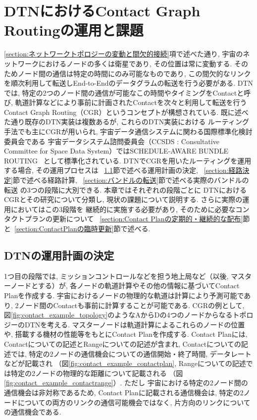 \chapter{DTNにおけるContact Graph Routingの運用と課題}
\label{chap:cgr_in_dtn}

\ref{section:ネットワークトポロジーの変動と間欠的接続}項で述べた通り, 
宇宙のネットワークにおけるノードの多くは衛星であり, その位置は常に変動する.  
そのためノード間の通信は特定の時間にのみ可能なものであり, 
この間欠的なリンクを順次利用して転送しEnd-to-Endのデータグラムの転送を行う必要がある.  
DTNでは, 特定の2つのノード間の通信が可能なこの時間やタイミングをContactと呼び, 
軌道計算などにより事前に計画されたContactを次々と利用して転送を行う
Contact Graph Routing（CGR）\cite{Fraire2021}というコンセプトが構想されている.  
既に述べた通り既存のDTN実装は複数あるが, これらのDTN実装における
ルーティング手法でも主にCGRが用いられ, 宇宙データ通信システムに関わる国際標準化検討委員会である
宇宙データシステム諮問委員会（CCSDS : Consultative Committee 
for Space Data System）ではSCHEDULE-AWARE BUNDLE ROUTING
~\cite{schedule_aware_bundle_routing}として標準化されている.  
DTNでCGRを用いたルーティングを運用する場合, その運用プロセスは
~\ref{section:運用計画の決定}節で述べる運用計画の決定, 
~\ref{section:経路決定}節で述べる経路計算, 
~\ref{section:バンドルの転送}節で述べる実際のバンドルの転送
の3つの段階に大別できる.  本章ではそれぞれの段階ごとに
DTNにおけるCGRとその研究について分類し, 現状の課題について説明する.  
さらに実際の運用においてはこの3段階を
継続的に実施する必要があり, そのために必要なコンタクトプランの更新について
~\ref{section:Contact Planの定期的・継続的な配布}節と~\ref{section:ContactPlanの臨時更新}節で述べる.  

\section{DTNの運用計画の決定}
\label{section:運用計画の決定}
1つ目の段階では, ミッションコントロールなどを担う地上局など（以後, マスターノードとする）が, 
各ノードの軌道計算やその他の情報に基づいてContact Planを作成する.  
宇宙におけるノードの物理的な軌道は計算により予測可能であり, 
2ノード間のContactも事前に計算することが可能である.   
CGRの例として, 図\ref{fig:contact_example_topology}のようなAからDの4つのノードからなるトポロジーのDTNを考える.  
マスターノードは軌道計算によるこれらのノードの位置や, 搭載する機材の性能等をもとにContact Planを作成する.  
Contact Planには, Contactについての記述とRangeについての記述が含まれ, 
Contactについての記述では, 特定の2ノードの通信機会についての通信開始・終了時間, データレートなどが記載され
（図\ref{fig:contact_example_contactplan}, Rangeについての記述では特定の2ノードの物理的な距離について記載される
（図\ref{fig:contact_example_contactrange}）.  
ただし%
宇宙における特定の2ノード間の通信機会は非対称であるため, 
Contact Planに記載される通信機会は, 特定の2ノードについての両方のリンクの通信可能機会ではなく, 
片方向のリンクについての通信機会である.  

